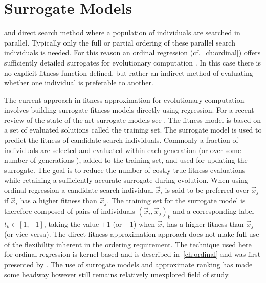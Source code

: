 

\chapter{Surrogate Models}\label{ch:surrogates} 

 and direct search method where a population of individuals are searched in parallel.  Typically only the full or partial ordering of these parallel search individuals is needed.  For this reason an ordinal regression (cf.~\cref{ch:ordinal}) offers sufficiently detailed surrogates for evolutionary computation \citep{Ru06:PPSN}.  In this case there is no explicit fitness function defined, but rather an indirect method of evaluating whether one individual is preferable to another.

The current approach in fitness approximation for evolutionary computation involves building surrogate fitness models directly using regression.  For a recent review of the state-of-the-art surrogate models see \citep{Ong04,Sobester05,Jin05,Lim07}. The fitness model is based on a set of evaluated solutions called the training set. The surrogate model is used to predict the fitness of candidate search individuals. Commonly a fraction of individuals are selected and evaluated within each generation (or over some number of generations \citep{Jin02}), added to the training set, and used for updating the surrogate.  The goal is to reduce the number of costly true fitness evaluations while retaining a sufficiently accurate surrogate during evolution. When using ordinal regression a candidate search individual $\vec{x}_i$ is said to be preferred over $\vec{x}_j$ if $\vec{x}_i$ has a higher fitness than $\vec{x}_j$. The training set for the surrogate model is therefore composed of pairs of individuals $(\vec{x}_i,\vec{x}_j)_k$ and a corresponding label $t_k\in[1,-1]$, taking the value $+1$ (or $-1$) when $\vec{x}_i$ has a higher fitness than $\vec{x}_j$ (or vice versa).  The direct fitness approximation approach does not make full use of the flexibility inherent in the ordering requirement. The technique used here for ordinal regression is kernel based and is described in~\cref{ch:ordinal} and was first presented by \citet{Ru06:PPSN}. The use of surrogate models and approximate  ranking has made some headway  \citep[cf.][]{Loshchilov10} however still remains relatively unexplored field of study.

